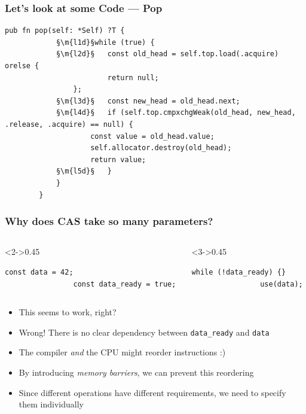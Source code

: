 \documentclass[aspectratio=169,listings,handout]{beamer}
\def\rtem{\item[\faCaretRight]}
\begin{document}
\begin{frame}[fragile]
	\frametitle{Let's look at some Code --- Pop}
	\begin{lstlisting}[language=zig]
		pub fn pop(self: *Self) ?T {
			§\m{l1d}§while (true) {
			§\m{l2d}§	const old_head = self.top.load(.acquire) orelse {
						return null;
				};
			§\m{l3d}§	const new_head = old_head.next;
			§\m{l4d}§	if (self.top.cmpxchgWeak(old_head, new_head, .release, .acquire) == null) {
					const value = old_head.value;
					self.allocator.destroy(old_head);
					return value;
			§\m{l5d}§	}
			}
		}
	\end{lstlisting}
\end{frame}

\begin{frame}[fragile]
	\frametitle{Why does CAS take so many parameters?}
	\begin{columns}[c]
		\begin{column}<2->{0.45\textwidth}
			\begin{lstlisting}[language=zig]
				const data = 42;
				const data_ready = true;
			\end{lstlisting}
		\end{column}
		\begin{column}<3->{0.45\textwidth}
			\begin{lstlisting}[language=zig]
				while (!data_ready) {}
				use(data);
			\end{lstlisting}
		\end{column}
	\end{columns}\par\bigskip
	\begin{itemize}
		\item<4-> This seems to work, right?
		\rtem<5-> Wrong! There is no clear dependency between \texttt{data\_ready} and \texttt{data}
		\rtem<6-> The compiler \emph{and} the CPU might reorder instructions :)\par\bigskip
		\item<7-> By introducing \emph{memory barriers}, we can prevent this reordering
		\rtem<8-> Since different operations have different requirements, we need to specify them individually
	\end{itemize}
\end{frame}
\end{document}
